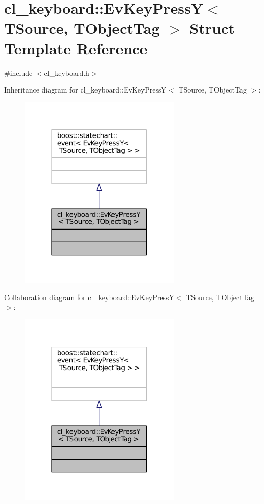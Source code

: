 \hypertarget{structcl__keyboard_1_1EvKeyPressY}{}\section{cl\+\_\+keyboard\+:\+:Ev\+Key\+PressY$<$ T\+Source, T\+Object\+Tag $>$ Struct Template Reference}
\label{structcl__keyboard_1_1EvKeyPressY}


{\ttfamily \#include $<$cl\+\_\+keyboard.\+h$>$}



Inheritance diagram for cl\+\_\+keyboard\+:\+:Ev\+Key\+PressY$<$ T\+Source, T\+Object\+Tag $>$\+:
\nopagebreak
\begin{figure}[H]
\begin{center}
\leavevmode
\includegraphics[width=219pt]{structcl__keyboard_1_1EvKeyPressY__inherit__graph}
\end{center}
\end{figure}


Collaboration diagram for cl\+\_\+keyboard\+:\+:Ev\+Key\+PressY$<$ T\+Source, T\+Object\+Tag $>$\+:
\nopagebreak
\begin{figure}[H]
\begin{center}
\leavevmode
\includegraphics[width=219pt]{structcl__keyboard_1_1EvKeyPressY__coll__graph}
\end{center}
\end{figure}


